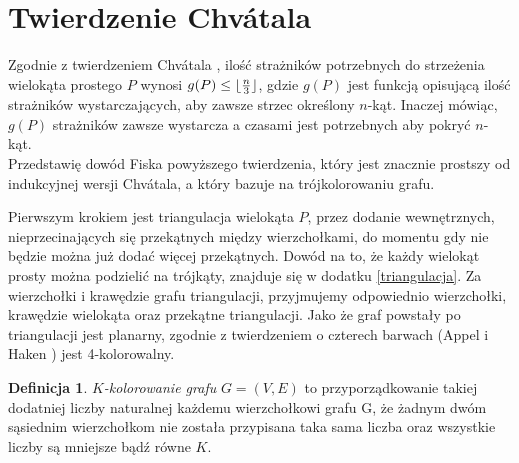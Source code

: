 \documentclass[brudnopis]{xmgr}
\DeclarePairedDelimiter\floor{\lfloor}{\rfloor}
\theoremstyle{definition}
\newtheorem{Definicja}{Definicja}
\begin{document}
\section{Twierdzenie Chv\'atala}
Zgodnie z twierdzeniem Chv\'atala \cite{chvatal} \label{tw chvatala}, ilość strażników potrzebnych do strzeżenia wielokąta prostego $P$ wynosi $g(P) \le \floor{\frac{n}{3}}$, gdzie $g(P)$ jest funkcją opisującą ilość strażników wystarczających, aby zawsze strzec określony $n$-kąt. Inaczej mówiąc, $g(P)$ strażników zawsze wystarcza a czasami jest potrzebnych aby pokryć $n$-kąt.
\\Przedstawię dowód Fiska \cite{fisk} powyższego twierdzenia, który jest znacznie prostszy od indukcyjnej wersji Chv\'atala, a który bazuje na trójkolorowaniu grafu. 

Pierwszym krokiem jest triangulacja wielokąta $P$, przez dodanie wewnętrznych, nieprzecinających się przekątnych między wierzchołkami, do momentu gdy nie będzie można już dodać więcej przekątnych. 
Dowód na to, że każdy wielokąt prosty można podzielić na trójkąty, znajduje się w dodatku \ref{triangulacja}.
Za wierzchołki i krawędzie grafu triangulacji, przyjmujemy odpowiednio wierzchołki, krawędzie wielokąta oraz przekątne triangulacji. Jako że graf powstały po triangulacji jest planarny, zgodnie z twierdzeniem o czterech barwach (Appel i Haken \cite{appel}) jest 4-kolorowalny.

\begin{Definicja} 
   \emph{$K$-kolorowanie grafu} $G = (V,E)$ to przyporządkowanie takiej dodatniej liczby naturalnej każdemu wierzchołkowi grafu G, że żadnym dwóm sąsiednim wierzchołkom nie została przypisana taka sama liczba oraz wszystkie liczby są mniejsze bądź równe $K$.
\end{Definicja}
\end{document}
